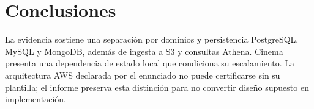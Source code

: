 \chapter{Conclusiones}La evidencia sostiene una separación por dominios y persistencia PostgreSQL, MySQL y MongoDB, además de ingesta a S3 y consultas Athena. Cinema presenta una dependencia de estado local que condiciona su escalamiento. La arquitectura AWS declarada por el enunciado no puede certificarse sin su plantilla; el informe preserva esta distinción para no convertir diseño supuesto en implementación.
